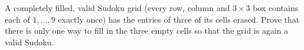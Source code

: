 A completely filled, valid Sudoku grid (every row, column and $3\times3$ box contains each of $1,\ldots,9$ exactly once) has the entries of three of its cells erased. Prove that there is only one way to fill in the three empty cells so that the grid is again a valid Sudoku.
